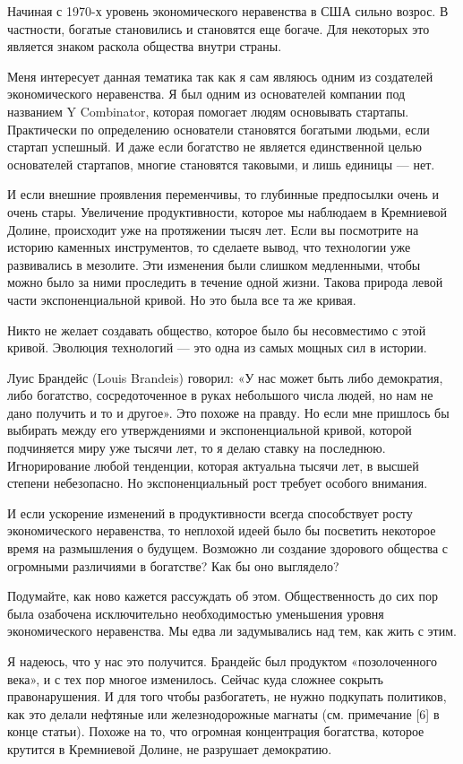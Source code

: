 \documentclass[ebook,12pt,oneside,openany]{memoir}
\begin{document}
Начиная с 1970-х уровень экономического неравенства в США сильно
возрос. В частности, богатые становились и становятся еще богаче. Для
некоторых это является знаком раскола общества внутри страны.

Меня интересует данная тематика так как я сам являюсь одним из
создателей экономического неравенства. Я был одним из основателей
компании под названием Y Combinator, которая помогает людям основывать
стартапы. Практически по определению основатели становятся богатыми
людьми, если стартап успешный. И даже если богатство не является
единственной целью основателей стартапов, многие становятся таковыми,
и лишь единицы — нет.

И если внешние проявления переменчивы, то глубинные предпосылки очень
и очень стары. Увеличение продуктивности, которое мы наблюдаем в
Кремниевой Долине, происходит уже на протяжении тысяч лет. Если вы
посмотрите на историю каменных инструментов, то сделаете вывод, что
технологии уже развивались в мезолите. Эти изменения были слишком
медленными, чтобы можно было за ними проследить в течение одной жизни.
Такова природа левой части экспоненциальной кривой. Но это была все та
же кривая.

Никто не желает создавать общество, которое было бы несовместимо с
этой кривой. Эволюция технологий — это одна из самых мощных сил в
истории.

Луис Брандейс (Louis Brandeis) говорил: «У нас может быть либо
демократия, либо богатство, сосредоточенное в руках небольшого числа
людей, но нам не дано получить и то и другое». Это похоже на правду.
Но если мне пришлось бы выбирать между его утверждениями и
экспоненциальной кривой, которой подчиняется миру уже тысячи лет, то я
делаю ставку на последнюю. Игнорирование любой тенденции, которая
актуальна тысячи лет, в высшей степени небезопасно. Но
экспоненциальный рост требует особого внимания.

И если ускорение изменений в продуктивности всегда способствует росту
экономического неравенства, то неплохой идеей было бы посветить
некоторое время на размышления о будущем. Возможно ли создание
здорового общества с огромными различиями в богатстве? Как бы оно
выглядело?

Подумайте, как ново кажется рассуждать об этом. Общественность до сих
пор была озабочена исключительно необходимостью уменьшения уровня
экономического неравенства. Мы едва ли задумывались над тем, как жить
с этим.

Я надеюсь, что у нас это получится. Брандейс был продуктом
«позолоченного века», и с тех пор многое изменилось. Сейчас куда
сложнее сокрыть правонарушения. И для того чтобы разбогатеть, не нужно
подкупать политиков, как это делали нефтяные или железнодорожные
магнаты (см. примечание [6] в конце статьи). Похоже на то, что
огромная концентрация богатства, которое крутится в Кремниевой Долине,
не разрушает демократию.
\end{document}
